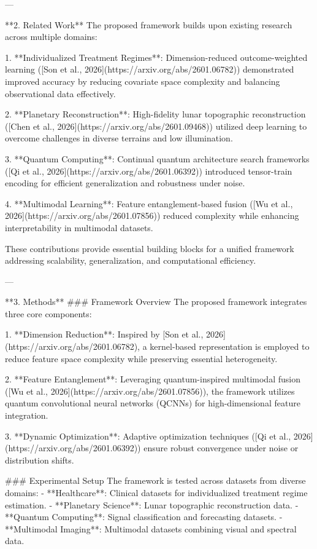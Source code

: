 ---

**2. Related Work**  
The proposed framework builds upon existing research across multiple domains:  

1. **Individualized Treatment Regimes**: Dimension-reduced outcome-weighted learning ([Son et al., 2026](https://arxiv.org/abs/2601.06782)) demonstrated improved accuracy by reducing covariate space complexity and balancing observational data effectively.  

2. **Planetary Reconstruction**: High-fidelity lunar topographic reconstruction ([Chen et al., 2026](https://arxiv.org/abs/2601.09468)) utilized deep learning to overcome challenges in diverse terrains and low illumination.  

3. **Quantum Computing**: Continual quantum architecture search frameworks ([Qi et al., 2026](https://arxiv.org/abs/2601.06392)) introduced tensor-train encoding for efficient generalization and robustness under noise.  

4. **Multimodal Learning**: Feature entanglement-based fusion ([Wu et al., 2026](https://arxiv.org/abs/2601.07856)) reduced complexity while enhancing interpretability in multimodal datasets.  

These contributions provide essential building blocks for a unified framework addressing scalability, generalization, and computational efficiency.  

---

**3. Methods**  
### Framework Overview  
The proposed framework integrates three core components:  

1. **Dimension Reduction**: Inspired by [Son et al., 2026](https://arxiv.org/abs/2601.06782), a kernel-based representation is employed to reduce feature space complexity while preserving essential heterogeneity.  

2. **Feature Entanglement**: Leveraging quantum-inspired multimodal fusion ([Wu et al., 2026](https://arxiv.org/abs/2601.07856)), the framework utilizes quantum convolutional neural networks (QCNNs) for high-dimensional feature integration.  

3. **Dynamic Optimization**: Adaptive optimization techniques ([Qi et al., 2026](https://arxiv.org/abs/2601.06392)) ensure robust convergence under noise or distribution shifts.  

### Experimental Setup  
The framework is tested across datasets from diverse domains:  
- **Healthcare**: Clinical datasets for individualized treatment regime estimation.  
- **Planetary Science**: Lunar topographic reconstruction data.  
- **Quantum Computing**: Signal classification and forecasting datasets.  
- **Multimodal Imaging**: Multimodal datasets combining visual and spectral data.  

